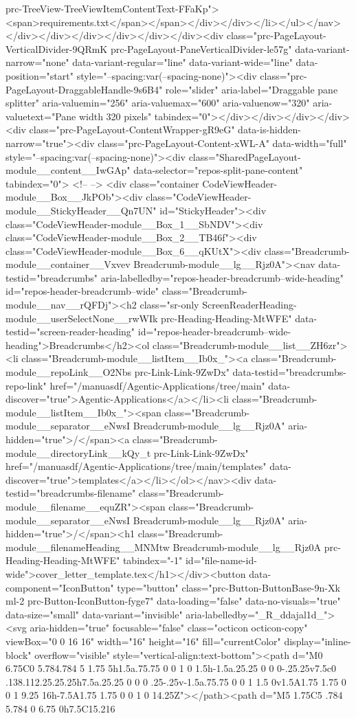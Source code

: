 {{{{{{{prc-TreeView-TreeViewItemContentText-FFaKp"><span>requirements.txt</span></span></div></div></li></ul></nav></div></div></div></div></div></div><div class="prc-PageLayout-VerticalDivider-9QRmK prc-PageLayout-PaneVerticalDivider-le57g" data-variant-narrow="none" data-variant-regular="line" data-variant-wide="line" data-position="start" style="--spacing:var(--spacing-none)"><div class="prc-PageLayout-DraggableHandle-9s6B4" role="slider" aria-label="Draggable pane splitter" aria-valuemin="256" aria-valuemax="600" aria-valuenow="320" aria-valuetext="Pane width 320 pixels" tabindex="0"></div></div></div></div><div class="prc-PageLayout-ContentWrapper-gR9eG" data-is-hidden-narrow="true"><div class="prc-PageLayout-Content-xWL-A" data-width="full" style="--spacing:var(--spacing-none)"><div class="SharedPageLayout-module__content__IwGAp" data-selector="repos-split-pane-content" tabindex="0"> <!-- --> <div class="container CodeViewHeader-module__Box__JkPOb"><div class="CodeViewHeader-module__StickyHeader__Qn7UN" id="StickyHeader"><div class="CodeViewHeader-module__Box_1__SbNDV"><div class="CodeViewHeader-module__Box_2__TB46f"><div class="CodeViewHeader-module__Box_6__qKUtX"><div class="Breadcrumb-module__container__Vxvev Breadcrumb-module__lg__Rjz0A"><nav data-testid="breadcrumbs" aria-labelledby="repos-header-breadcrumb--wide-heading" id="repos-header-breadcrumb--wide" class="Breadcrumb-module__nav__rQFDj"><h2 class="sr-only ScreenReaderHeading-module__userSelectNone__rwWIk prc-Heading-Heading-MtWFE" data-testid="screen-reader-heading" id="repos-header-breadcrumb--wide-heading">Breadcrumbs</h2><ol class="Breadcrumb-module__list__ZH6zr"><li class="Breadcrumb-module__listItem__Ib0x_"><a class="Breadcrumb-module__repoLink__O2Nbs prc-Link-Link-9ZwDx" data-testid="breadcrumbs-repo-link" href="/manuasdf/Agentic-Applications/tree/main" data-discover="true">Agentic-Applications</a></li><li class="Breadcrumb-module__listItem__Ib0x_"><span class="Breadcrumb-module__separator__eNwsI Breadcrumb-module__lg__Rjz0A" aria-hidden="true">/</span><a class="Breadcrumb-module__directoryLink__kQy_t prc-Link-Link-9ZwDx" href="/manuasdf/Agentic-Applications/tree/main/templates" data-discover="true">templates</a></li></ol></nav><div data-testid="breadcrumbs-filename" class="Breadcrumb-module__filename__equZR"><span class="Breadcrumb-module__separator__eNwsI Breadcrumb-module__lg__Rjz0A" aria-hidden="true">/</span><h1 class="Breadcrumb-module__filenameHeading__MNMtw Breadcrumb-module__lg__Rjz0A prc-Heading-Heading-MtWFE" tabindex="-1" id="file-name-id-wide">cover_letter_template.tex</h1></div><button data-component="IconButton" type="button" class="prc-Button-ButtonBase-9n-Xk ml-2 prc-Button-IconButton-fyge7" data-loading="false" data-no-visuals="true" data-size="small" data-variant="invisible" aria-labelledby="_R_ddajal1d_"><svg aria-hidden="true" focusable="false" class="octicon octicon-copy" viewBox="0 0 16 16" width="16" height="16" fill="currentColor" display="inline-block" overflow="visible" style="vertical-align:text-bottom"><path d="M0 6.75C0 5.784.784 5 1.75 5h1.5a.75.75 0 0 1 0 1.5h-1.5a.25.25 0 0 0-.25.25v7.5c0 .138.112.25.25.25h7.5a.25.25 0 0 0 .25-.25v-1.5a.75.75 0 0 1 1.5 0v1.5A1.75 1.75 0 0 1 9.25 16h-7.5A1.75 1.75 0 0 1 0 14.25Z"></path><path d="M5 1.75C5 .784 5.784 0 6.75 0h7.5C15.216 }}}}}}}
